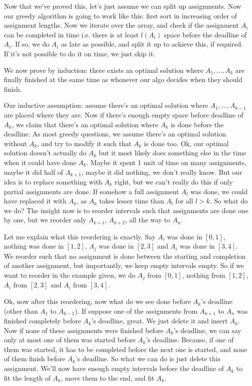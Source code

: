 \documentclass[12pt]{report}
\begin{document}
\begin{enumerate}[label=\textbf{\arabic*.}]
  Now that we've proved this, let's just assume we can split up assignments. Now our greedy algorithm is going to work like this: first sort in increasing order of 
  assignment lengths. Now we iterate over the array, and check if the assignment $A_i$ can be completed in time i.e. there is at least $l(A_i)$ space before the 
  deadline of $A_i$. If so, we do $A_i$ as late as possible, and split it up to achieve this, if required. If it's not possible to do it on time, we just skip it.

  We now prove by induction: there exists an optimal solution where $A_1, \dots, A_k$ are finally finished at the same time as whenever our algo decides when they 
  should finish.

  Our inductive assumption: assume there's an optimal solution where $A_1, \dots, A_{k-1}$ are placed where they are. Now if there's enough empty space before deadline
  of $A_k$, we claim that there's an optimal solution where $A_k$ is done before the deadline. As most greedy questions, we assume there's an optimal solution without 
  $A_k$, and try to modify it such that $A_k$ is done too. Ok, our optimal solution doesn't actually do $A_k$ but it most likely does something else in the time when 
  it could have done $A_k$. Maybe it spent 1 unit of time on many assignments, maybe it did half of $A_{k+1}$, maybe it did nothing, we don't really know. But our idea 
  is to replace something with $A_k$ right, but we can't really do this if only partial assignments are done. If somehow a full assignment $A_l$ was done, we could have 
  replaced it with $A_k$, as $A_k$ takes lesser time than $A_l$ for all $l > k$. So what do we do? The insight now is to reorder intervals such that assignments are done 
  one by one, but we reorder only $A_{k+1}$, $A_{k+2}$, all the way to $A_n$.

  Let me explain what this reordering is exactly. Say $A_i$ was done in $[0,1]$, nothing was done in $[1,2]$, $A_j$ was done in $[2,3]$ and $A_i$ was done in $[3,4]$.
  We reorder such that no assignment is done between the starting and completion of another assignment, but importantly, we keep empty intervals empty. So if we want 
  to reorder in the example given, we do $A_j$ from $[0,1]$, nothing from $[1,2]$, $A_i$ from $[2,3]$ and $A_i$ from $[3,4]$.

  Ok, now after this reordering, now what do we see done before $A_k$'s deadline (other than $A_1$ to $A_{k-1}$). If suppose one of the assignments from $A_{k+1}$ to 
  $A_n$ was finished completely before $A_k$'s deadline, great. We just delete it and insert $A_k$. Now if none of these assignments were finished before $A_k$'s deadline,
  we can say only at most one of them was started before $A_k$'s deadline. Because, if one of them was started, it has to be completed before the next one is started, and
  none of them finish before $A_k$'s deadline. So what we can do is just delete this assignment. We'll now have enough empty intervals before the deadline of $A_k$
  to fit the length of $A_k$, move them to the end, and fit $A_k$.


\end{enumerate}
\end{document}

